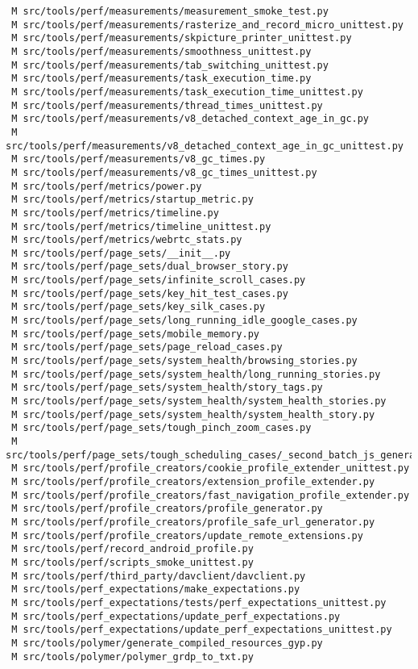 \documentclass{article}
\begin{document}
\begin{verbatim}
 M src/tools/perf/measurements/measurement_smoke_test.py
 M src/tools/perf/measurements/rasterize_and_record_micro_unittest.py
 M src/tools/perf/measurements/skpicture_printer_unittest.py
 M src/tools/perf/measurements/smoothness_unittest.py
 M src/tools/perf/measurements/tab_switching_unittest.py
 M src/tools/perf/measurements/task_execution_time.py
 M src/tools/perf/measurements/task_execution_time_unittest.py
 M src/tools/perf/measurements/thread_times_unittest.py
 M src/tools/perf/measurements/v8_detached_context_age_in_gc.py
 M src/tools/perf/measurements/v8_detached_context_age_in_gc_unittest.py
 M src/tools/perf/measurements/v8_gc_times.py
 M src/tools/perf/measurements/v8_gc_times_unittest.py
 M src/tools/perf/metrics/power.py
 M src/tools/perf/metrics/startup_metric.py
 M src/tools/perf/metrics/timeline.py
 M src/tools/perf/metrics/timeline_unittest.py
 M src/tools/perf/metrics/webrtc_stats.py
 M src/tools/perf/page_sets/__init__.py
 M src/tools/perf/page_sets/dual_browser_story.py
 M src/tools/perf/page_sets/infinite_scroll_cases.py
 M src/tools/perf/page_sets/key_hit_test_cases.py
 M src/tools/perf/page_sets/key_silk_cases.py
 M src/tools/perf/page_sets/long_running_idle_google_cases.py
 M src/tools/perf/page_sets/mobile_memory.py
 M src/tools/perf/page_sets/page_reload_cases.py
 M src/tools/perf/page_sets/system_health/browsing_stories.py
 M src/tools/perf/page_sets/system_health/long_running_stories.py
 M src/tools/perf/page_sets/system_health/story_tags.py
 M src/tools/perf/page_sets/system_health/system_health_stories.py
 M src/tools/perf/page_sets/system_health/system_health_story.py
 M src/tools/perf/page_sets/tough_pinch_zoom_cases.py
 M src/tools/perf/page_sets/tough_scheduling_cases/_second_batch_js_generator.py
 M src/tools/perf/profile_creators/cookie_profile_extender_unittest.py
 M src/tools/perf/profile_creators/extension_profile_extender.py
 M src/tools/perf/profile_creators/fast_navigation_profile_extender.py
 M src/tools/perf/profile_creators/profile_generator.py
 M src/tools/perf/profile_creators/profile_safe_url_generator.py
 M src/tools/perf/profile_creators/update_remote_extensions.py
 M src/tools/perf/record_android_profile.py
 M src/tools/perf/scripts_smoke_unittest.py
 M src/tools/perf/third_party/davclient/davclient.py
 M src/tools/perf_expectations/make_expectations.py
 M src/tools/perf_expectations/tests/perf_expectations_unittest.py
 M src/tools/perf_expectations/update_perf_expectations.py
 M src/tools/perf_expectations/update_perf_expectations_unittest.py
 M src/tools/polymer/generate_compiled_resources_gyp.py
 M src/tools/polymer/polymer_grdp_to_txt.py

\end{verbatim}
\end{document}

